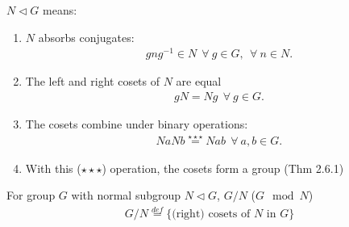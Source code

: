 \noindent $N\triangleleft G$ means:
\begin{enumerate}
    \item $N$ absorbs conjugates:
    \begin{align}
        gng^{-1}\in N \ \ \forall \ g \in G, \ \ \forall \ n \in N. \nonumber
    \end{align}
    \item The left and right cosets of $N$ are equal
    \begin{align}
        gN=Ng \ \ \forall \ g \in G. \nonumber
    \end{align}
    \item The cosets combine under binary operations:
    \begin{align}
        NaNb\overset{\star\star\star}{=}Nab \ \ \forall \ a,b \in G. \nonumber
    \end{align}
    \item With this ($\star\star\star$) operation, the cosets form a group (Thm 2.6.1)
\end{enumerate}
\begin{definition}
For group $G$ with normal subgroup $N\triangleleft G$, $G/N$ ($G \mod N$)
\begin{align}
    G/N\overset{def}{=}\{\text{(right) cosets of }N \text{ in } G\}\nonumber
\end{align}
\end{definition}
\newpage
